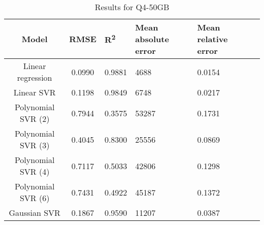 \begin{table}[H]
\centering
\begin{adjustbox}{center}
\begin{tabular}{c | c M{1.2cm} M{2.5cm} M{2.5cm} M{1.8cm}}
Model & RMSE & R\textsuperscript{2} & Mean absolute error & Mean relative error \tabularnewline
\hline
Linear regression & 0.0990 & 0.9881 &   4688 & 0.0154 \\
Linear SVR & 0.1198 & 0.9849 &   6748 & 0.0217 \\
Polynomial SVR (2) & 0.7944 & 0.3575 &  53287 & 0.1731 \\
Polynomial SVR (3) & 0.4045 & 0.8300 &  25556 & 0.0869 \\
Polynomial SVR (4) & 0.7117 & 0.5033 &  42806 & 0.1298 \\
Polynomial SVR (6) & 0.7431 & 0.4922 &  45187 & 0.1372 \\
Gaussian SVR & 0.1867 & 0.9590 &  11207 & 0.0387 \\
\end{tabular}
\end{adjustbox}
\\
\caption{Results for Q4-50GB}
\label{tab:all_linear_Q4_50}
\end{table}
